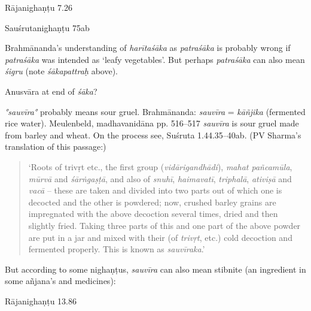 \begin{ekdosis}
\begin{philcomm}[hp01_059]
Rājanighaṇṭu 7.26

\begin{versinnote}
\end{versinnote}

Sauśrutanighaṇṭu 75ab
\begin{versinnote}
\end{versinnote}

Brahmānanda’s understanding of \emph{harītaśāka} as \emph{patraśāka} is probably wrong if \emph{patraśāka} was intended as ‘leafy vegetables’. But perhaps \emph{patraśāka} can also mean \emph{śigru} (note \emph{śākapattraḥ} above).

Anusvāra at end of \emph{śāka}?

\emph{°sauvīra°} probably means sour gruel.
Brahmānanda: \emph{sauvīra} = \emph{kāñjika} (fermented rice water).
Meulenbeld, madhavanidāna pp. 516–517
\emph{sauvīra} is sour gruel made from barley and wheat. On the process see, Suśruta 1.44.35--40ab.
(PV Sharma’s translation of this passage:)

\begin{quote}
‘Roots of trivṛt etc., the first group (\emph{vidārigandhādi}), \emph{mahat pañcamūla}, \emph{mūrvā} and \emph{śārṅgaṣṭā}, and also of \emph{snuhī}, \emph{haimavatī}, \emph{triphalā}, \emph{ativiṣā} and \emph{vacā} -- these are taken and divided into two parts out of which one is decocted and the other is powdered; now, crushed barley grains are impregnated with the above decoction several times, dried and then slightly fried. Taking three parts of this and one part of the above powder are put in a jar and mixed with their (of \emph{trivṛt}, etc.) cold decoction and fermented properly. This is known as \emph{sauvīraka}.’
\end{quote}

But according to some nighaṇṭus, \emph{sauvīra} can also mean stibnite (an ingredient in some añjana’s and medicines):

Rājanighaṇṭu 13.86

\begin{versinnote}
\end{versinnote}


\end{philcomm}
\end{ekdosis}
